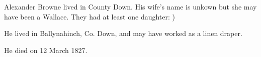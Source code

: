 
Alexander Browne lived in County Down. His wife's name is unkown but she may have been a Wallace. They had at least one daughter: )

He lived in Ballynahinch, Co. Down, and may have worked as a linen draper.

He died on 12 March 1827. 	


